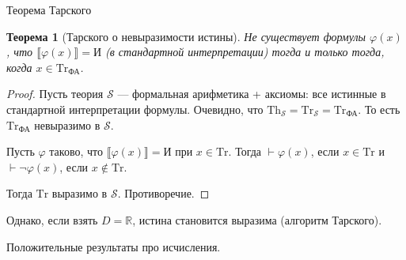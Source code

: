 \documentclass[aspectratio=169]{beamer}
\newtheorem{thm}{Теорема}[section]
\begin{document}
\begin{frame}{Теорема Тарского}
\begin{thm}[Тарского о невыразимости истины]
Не существует формулы $\varphi(x)$, что $\llbracket \varphi(x) \rrbracket = \text{И}$ (в стандартной интерпретации) тогда и только
тогда, когда $x \in \text{Tr}_\text{ФА}$. \end{thm}
\begin{proof}
Пусть теория $\mathcal{S}$ --- формальная арифметика + аксиомы: все истинные в стандартной интерпретации формулы.
Очевидно, что $\text{Th}_\mathcal{S} = \text{Tr}_\mathcal{S} = \text{Tr}_\text{ФА}$. 
То есть $\text{Tr}_\text{ФА}$ невыразимо в $\mathcal{S}$.

Пусть $\varphi$ таково, что $\llbracket\varphi(x)\rrbracket = \text{И}$ при $x \in \text{Tr}$.
Тогда $\vdash\varphi(x)$, если $x \in \text{Tr}$ и $\vdash\neg\varphi(x)$, если $x \notin\text{Tr}$.

Тогда $\text{Tr}$ выразимо в $\mathcal{S}$. Противоречие.
\end{proof}

\pause
Однако, если взять $D = \mathbb{R}$, истина становится выразима (алгоритм Тарского).
\end{frame}

\begin{frame}{}
\begin{center}\Large Положительные результаты про исчисления.\end{center}
\end{frame}
\end{document}
